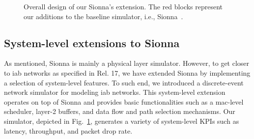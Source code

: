 \begin{figure}
{
}
\caption{Overall design of our Sionna's extension. The red blocks represent our additions to the baseline simulator, i.e., Sionna~\cite{hoydis2022sionna}.}
\label{fig:simulator_design}
\end{figure} \subsection{System-level extensions to Sionna}
\label{sub:nonPHY_simulator}
As mentioned, Sionna is mainly a physical layer simulator. However, to get closer to \gls{iab} networks as specified in Rel. 17, we have extended Sionna by implementing a selection of system-level features. To such end, we introduced a discrete-event network simulator for modeling \gls{iab} networks. This system-level extension operates on top of Sionna and provides basic functionalities such as a \gls{mac}-level scheduler, layer-2 buffers, and data flow and path selection mechanisms. Our simulator, depicted in Fig.~\ref{fig:simulator_design}, generates a variety of system-level KPIs such as latency, throughput, and packet drop rate. 


